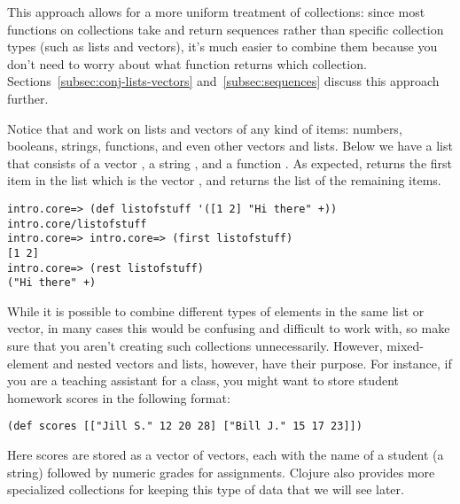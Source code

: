 This approach allows for a more uniform treatment of collections: since most functions on collections take and return sequences rather than specific collection types (such as lists and vectors), it's much easier to combine them because you don't need to worry about what function returns which collection. Sections~\ref{subsec:conj-lists-vectors} and~\ref{subsec:sequences} discuss this approach further. 


Notice that  and  work on lists and vectors of any kind of items: numbers, booleans, strings, functions, and even other vectors and lists. Below we have a list that consists of a vector \clocode{[1 2]}, a string , and a function \clocode{+}. As expected,  returns the first item in the list which is the vector \clocode{[1 2]}, and  returns the list of the remaining items. 
\begin{framed}
\begin{verbatim}
intro.core=> (def listofstuff '([1 2] "Hi there" +))
intro.core/listofstuff
intro.core=> intro.core=> (first listofstuff)
[1 2]
intro.core=> (rest listofstuff)
("Hi there" +)
\end{verbatim}
\end{framed}
While it is possible to combine different types of elements in the same list or vector, in many cases this would be confusing and difficult to work with, so make sure that you aren't creating such collections unnecessarily. 
However, mixed-element and nested vectors and lists, however, have their purpose. For instance, if you are a teaching assistant for a class, you might want to store student homework scores in the following format:
\begin{framed}
\begin{verbatim}
(def scores [["Jill S." 12 20 28] ["Bill J." 15 17 23]])
\end{verbatim}
\end{framed}
Here scores are stored as a vector of vectors, each with the name of a student (a string) followed by numeric grades for assignments. Clojure also provides more specialized collections for keeping this type of data that we will see later. 

